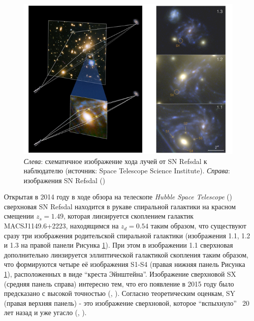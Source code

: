\begin{figure}[H]
    \centering
	\includegraphics[width=0.9\linewidth]{pics/snrefsdal.png}
	\caption{\textit{Слева}: схематичное изображение хода лучей от SN Refsdal к  наблюдателю (источник: Space Telescope Science Institute). \textit{Справа}: изображения SN Refsdal (\cite{treu2016})}
	\label{fig:snrefsdalfig}
\end{figure}

Открытая в 2014 году в ходе обзора на телескопе \textit{Hubble Space Telescope} (\cite{kelly2014}) сверхновая SN Refsdal находится в рукаве спиральной галактики на красном смещении $z_s= 1.49$, которая линзируется скоплением галактик MACSJ1149.6+2223, находящимся на $z_d = 0.54$ таким образом, что существуют сразу три изображения родительской спиральной галактики (изображения 1.1, 1.2 и 1.3 на правой панели Рисунка \ref{fig:snrefsdalfig}). При этом в изображении 1.1 сверхновая дополнительно линзируется эллиптической галактикой скопления таким образом, что формируются четыре её изображения S1-S4 (правая нижняя панель Рисунка \ref{fig:snrefsdalfig}), расположенных в виде “креста Эйнштейна”. Изображение сверхновой SX (средняя панель справа) интересно тем, что его появление в 2015 году было предсказано с высокой точностью (\cite{kelly2014}, \cite{treu2016}). Согласно теоретическим оценкам, SY (правая верхняя панель) - это изображение сверхновой, которое “вспыхнуло” ~20 лет назад и уже угасло (\cite{kelly2014}, \cite{treu2016}).

